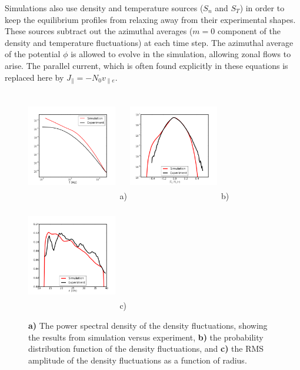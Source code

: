 \documentclass[showpacs,preprintnumbers,amsmath,amssymb,superscriptaddress]{revtex4}
\def\para{\parallel}
\newcommand{\vpe}{v_{\parallel e}}
\begin{document}
Simulations also use density and temperature sources ($S_n$ and $S_T$) in order to keep the equilibrium profiles from relaxing away from their experimental shapes. 
These sources subtract out the azimuthal averages ($m=0$ component of the density and temperature fluctuations) at each time step. 
The azimuthal average of the potential $\phi$ is allowed to evolve in
the simulation, allowing zonal flows to arise.
The parallel current, which is often found explicitly in these equations is replaced here by $J_\para = - N_0 \vpe$. \\


\begin{figure}[!htbp]
\includegraphics[width=0.35\textwidth,height=48mm]{sim_vs_exp_spec}~a)
\hfil
\includegraphics[width=0.35\textwidth,height=48mm]{pdf}~b)
\hfil
\includegraphics[width=0.35\textwidth,height=48mm]{radial_rms}~c)
\hfil
\caption{\textbf{a)} The power spectral density of the density fluctuations, showing the results from simulation versus experiment, \textbf{b)} the probability distribution function
of the density fluctuations, and \textbf{c)} the RMS amplitude of the density fluctuations as a function of radius.}
\label{validation}
\end{figure}
\end{document}
